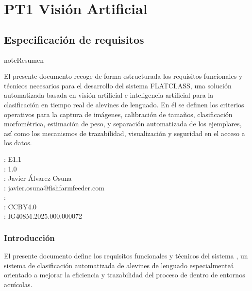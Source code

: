 \documentclass[a4paper,10pt,spanish]{jupyterBook}
\begin{document}
\sphinxstepscope


\part{PT1 \sphinxhyphen{} Visión Artificial}

\sphinxstepscope


\chapter{Especificación de requisitos}
\label{\detokenize{content/01/Requisitos:especificacion-de-requisitos}}\label{\detokenize{content/01/Requisitos::doc}}
\begin{sphinxadmonition}{note}{Resumen}

\sphinxAtStartPar
El presente documento recoge de forma estructurada los requisitos funcionales y técnicos necesarios para el desarrollo del sistema FLATCLASS, una solución automatizada basada en visión artificial e inteligencia artificial para la clasificación en tiempo real de alevines de lenguado. En él se definen los criterios operativos para la captura de imágenes, calibración de tamaños, clasificación morfométrica, estimación de peso, y separación automatizada de los ejemplares, así como los mecanismos de trazabilidad, visualización y seguridad en el acceso a los datos.

\sphinxAtStartPar
{}: E1.1\\
: 1.0\\
: Javier Álvarez Osuna\\
: javier.osuna@fishfarmfeeder.com\\
: \\
: CC\sphinxhyphen{}BY\sphinxhyphen{}4.0\\
: IG408M.2025.000.000072

\begin{figure}[H]
\centering

\noindent{}
\end{figure}
\end{sphinxadmonition}


\section{Introducción}
\label{\detokenize{content/01/Requisitos:introduccion}}
\sphinxAtStartPar
El presente documento define los requisitos funcionales y técnicos del sistema , un sistema de clasificación automatizada de alevines de lenguado especialmenteá orientado a mejorar la eficiencia y trazabilidad del proceso de  dentro de entornos acuícolas.
\end{document}
